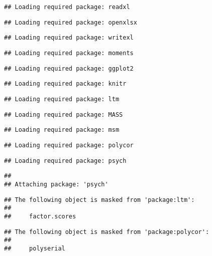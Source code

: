 \documentclass[
]{article}
\begin{document}
\begin{verbatim}
## Loading required package: readxl
\end{verbatim}

\begin{verbatim}
## Loading required package: openxlsx
\end{verbatim}

\begin{verbatim}
## Loading required package: writexl
\end{verbatim}

\begin{verbatim}
## Loading required package: moments
\end{verbatim}

\begin{verbatim}
## Loading required package: ggplot2
\end{verbatim}

\begin{verbatim}
## Loading required package: knitr
\end{verbatim}

\begin{verbatim}
## Loading required package: ltm
\end{verbatim}

\begin{verbatim}
## Loading required package: MASS
\end{verbatim}

\begin{verbatim}
## Loading required package: msm
\end{verbatim}

\begin{verbatim}
## Loading required package: polycor
\end{verbatim}

\begin{verbatim}
## Loading required package: psych
\end{verbatim}

\begin{verbatim}
## 
## Attaching package: 'psych'
\end{verbatim}

\begin{verbatim}
## The following object is masked from 'package:ltm':
## 
##     factor.scores
\end{verbatim}

\begin{verbatim}
## The following object is masked from 'package:polycor':
## 
##     polyserial
\end{verbatim}
\end{document}

